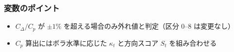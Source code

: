 \subsubsection*{変数のポイント}
\begin{flushleft}
\begin{itemize}
  \item $C_\Delta/C_p$ が \(\pm1\%\) を超える場合のみ外れ値と判定（区分 0--8 は変更なし）
  \item $C_p$ 算出にはボラ水準に応じた \(\kappa_t\) と方向スコア $S_t$ を組み合わせる
\end{itemize}
\end{flushleft}

\bigskip

